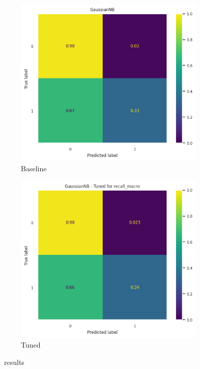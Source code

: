 \begin{frame}{\subsecname}
\begin{figure}
    \centering
    \begin{subfigure}[c]{0.4\textwidth}
        \includegraphics[width=\textwidth]{images/models/GNB_base.png}
        \caption{Baseline}
    \end{subfigure}
    \begin{subfigure}[c]{0.4\textwidth}
        \includegraphics[width=\textwidth]{images/models/GNB_tuned.png}
        \caption{Tuned}
    \end{subfigure}
    \caption{\subsecname\ results}
\end{figure}
\end{frame}

